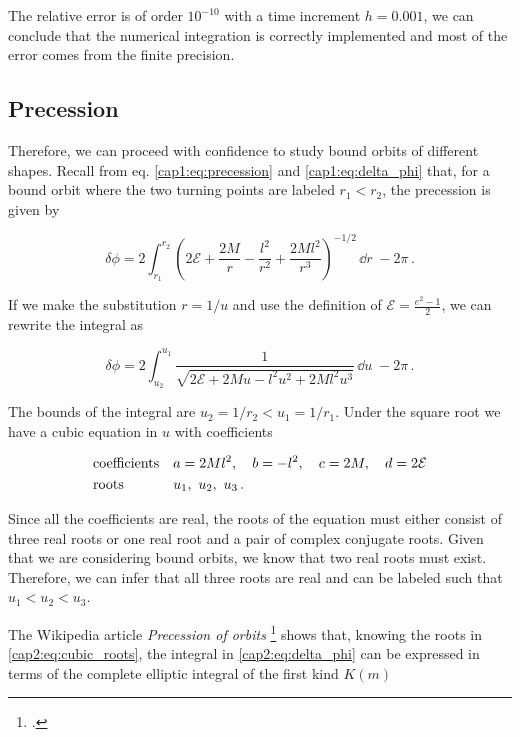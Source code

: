 The relative error is of order $10^{-10}$ with a time increment $h = 0.001$, we
can conclude that the numerical integration is correctly implemented and most
of the error comes from the finite precision.


\subsection{Precession}

Therefore, we can proceed with confidence to study bound orbits of different
shapes.
Recall from eq. \ref{cap1:eq:precession} and \ref{cap1:eq:delta_phi} that, for a
bound orbit where the two turning points are labeled $r_1 < r_2$, the
precession is given by

\begin{equation}
    \delta \phi = 2 \int_{r_1}^{r_2} \left( 2 \mathcal E + \frac{2M}{r}
    - \frac{l^2}{r^2} + \frac{2Ml^2}{r^3} \right)^{-1/2} \, \dd{r}
    \; - 2 \pi \, .
\end{equation}

If we make the substitution $r = 1 / u$ and use the definition of $\mathcal E
= \frac{e^2 - 1}{2}$, we can rewrite the integral as

\begin{equation}
    \delta \phi = 2 \int_{u_2}^{u_1} \frac{1}{\sqrt{2 \mathcal E + 2Mu - l^2 u^2
    + 2Ml^2 u^3}} \, \dd{u}
    \; - 2 \pi \, .
    \label{cap2:eq:delta_phi}
\end{equation}

The bounds of the integral are $u_2 = 1 / r_2 < u_1 = 1 / r_1$.
Under the square root we have a cubic equation in $u$ with coefficients

\begin{align}
    &{\rm coefficients} && a = 2Ml^2, \quad b = -l^2, \quad c = 2M, \quad d = 2 \mathcal E \\
    &{\rm roots}        && u_1, ~ u_2, ~ u_3 \, .
    \label{cap2:eq:cubic_roots}
\end{align}

Since all the coefficients are real, the roots of the equation must either
consist of three real roots or one real root and a pair of complex conjugate
roots.
Given that we are considering bound orbits, we know that two real roots must
exist.
Therefore, we can infer that all three roots are real and can be labeled such
that $u_1 < u_2 < u_3$.

The Wikipedia article \textit{Precession of orbits} \footcite{enwiki:1242536958}
shows that, knowing the roots in \ref{cap2:eq:cubic_roots}, the integral in
\ref{cap2:eq:delta_phi} can be expressed in terms of the complete elliptic
integral of the first kind $K(m)$

